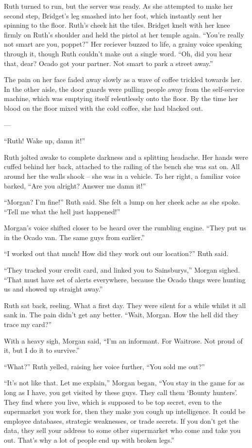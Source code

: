 Ruth turned to run, but the server was ready. As she attempted to make her second step, Bridget’s leg smashed into her foot, which instantly sent her spinning to the floor. Ruth’s cheek hit the tiles. Bridget knelt with her knee firmly on Ruth’s shoulder and held the pistol at her temple again. “You’re really not smart are you, poppet?” Her reciever buzzed to life, a grainy voice speaking through it, though Ruth couldn’t make out a single word. “Oh, did you hear that, dear? Ocado got your partner. Not smart to park a street away.” 

The pain on her face faded away slowly as a wave of coffee trickled towards her. In the other aisle, the door guards were pulling people away from the self-service machine, which was emptying itself relentlessly onto the floor. By the time her blood on the floor mixed with the cold coffee, she had blacked out. 

--- 

“Ruth! Wake up, damn it!”

Ruth jolted awake to complete darkness and a splitting headache. Her hands were cuffed behind her back, attached to the railing of the bench she was sat on. All around her the walls shook – she was in a vehicle. To her right, a familiar voice barked, “Are you alright? Answer me damn it!”

“Morgan? I’m fine!” Ruth said. She felt a lump on her cheek ache as she spoke. “Tell me what the hell just happened!”

Morgan’s voice shifted closer to be heard over the rumbling engine. “They put us in the Ocado van. The same guys from earlier.”

“I worked out that much! How did they work out our location?” Ruth said. 

“They tracked your credit card, and linked you to Sainsburys,” Morgan sighed. “That must have set of alerts everywhere, because the Ocado thugs were hunting us and showed up straight away.”

Ruth sat back, reeling. What a first day. They were silent for a while whilst it all sank in. The pain didn’t get any better. “Wait, Morgan. How the hell did they trace my card?”

With a heavy sigh, Morgan said, “I’m an informant. For Waitrose. Not proud of it, but I do it to survive.” 

“What?” Ruth yelled, raising her voice further, “You sold me out?”

“It’s not like that. Let me explain,” Morgan began, “You stay in the game for as long as I have, you get visited by these guys. They call them ‘Bounty hunters’. They find where you live, which is supposed to be top secret, even to the supermarket you work for, then they make you cough up intelligence. It could be employee databases, strategic weaknesses, or trade secrets. If you don’t get the data, they sell your address to some other supermarket who come and take you out. That’s why a lot of people end up with broken legs.” 

